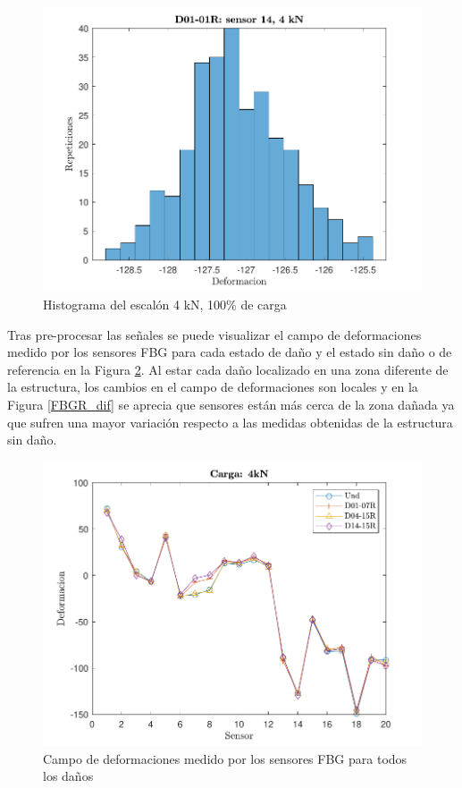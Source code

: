 \begin{figure}[h!]
    \centering
    \includegraphics[width=125mm, angle=0]{3/Fotos/Histograma_FBG.pdf}
    \captionsetup{justification=centering,margin=1.25cm}
    \caption{Histograma del escalón 4 kN, 100\% de carga}
    \label{def_h}
\end{figure}    

Tras pre-procesar las señales se puede visualizar el campo de deformaciones medido por los sensores FBG para cada estado de daño y el estado sin daño o de referencia en la Figura \ref{FBGR_dam}. Al estar cada daño localizado en una zona diferente de la estructura, los cambios en el campo de deformaciones son locales y en la Figura \ref{FBGR_dif} se aprecia que sensores están más cerca de la zona dañada ya que sufren una mayor variación respecto a las medidas obtenidas de la estructura sin daño.

\begin{figure}[h!]
    \centering
    \includegraphics[width=125mm, angle=0]{3/Fotos/FBG_damages.pdf}
    \captionsetup{justification=centering,margin=1.25cm}
    \caption{Campo de deformaciones medido por los sensores FBG para todos los daños}
    \label{FBGR_dam}
\end{figure}
        
